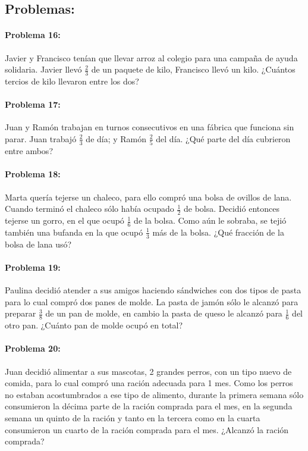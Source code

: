 \documentclass[10pt,twoside]{article}
\begin{document}
\subsection*{Problemas:}
\paragraph*{Problema 16:} Javier y Francisco tenían que llevar arroz al colegio para una campaña de ayuda solidaria. Javier llevó $\frac{2}{3}$ de un paquete de kilo, Francisco llevó un kilo. ¿Cuántos tercios de kilo llevaron entre los dos?
\paragraph*{Problema 17:} Juan y Ramón trabajan en turnos consecutivos en una fábrica que funciona sin parar. Juan trabajó $\frac{2}{3}$ de día; y Ramón $\frac{2}{5}$ del día. ¿Qué parte del día cubrieron entre ambos?
\paragraph*{Problema 18:} Marta quería tejerse un chaleco, para ello compró una bolsa de ovillos de lana. Cuando terminó el chaleco sólo había ocupado $\frac{1}{2}$ de bolsa. Decidió entonces tejerse un gorro, en el que ocupó $\frac{1}{6}$ de la bolsa. Como aún le sobraba, se tejió también una bufanda en la que ocupó $\frac{1}{3}$ más de la bolsa. ¿Qué
fracción de la bolsa de lana usó?
\paragraph*{Problema 19:} Paulina decidió atender a sus amigos haciendo sándwiches con dos tipos de pasta para lo cual compró dos panes de molde. La pasta de jamón sólo le alcanzó para preparar $\frac{3}{8}$ de un pan de molde, en cambio la pasta de queso le alcanzó para $\frac{1}{6}$ del otro pan. ¿Cuánto pan de molde ocupó en total?
\paragraph*{Problema 20:} Juan decidió alimentar a sus mascotas, 2 grandes perros, con un tipo nuevo de comida, para lo cual compró una ración adecuada para 1 mes. Como los perros no estaban acostumbrados a ese tipo de alimento, durante la primera semana sólo
consumieron la décima parte de la ración comprada
para el mes, en la segunda semana un quinto de la
ración y tanto en la tercera como en la cuarta
consumieron un cuarto de la ración comprada para
el mes. ¿Alcanzó la ración comprada?
\end{document}
